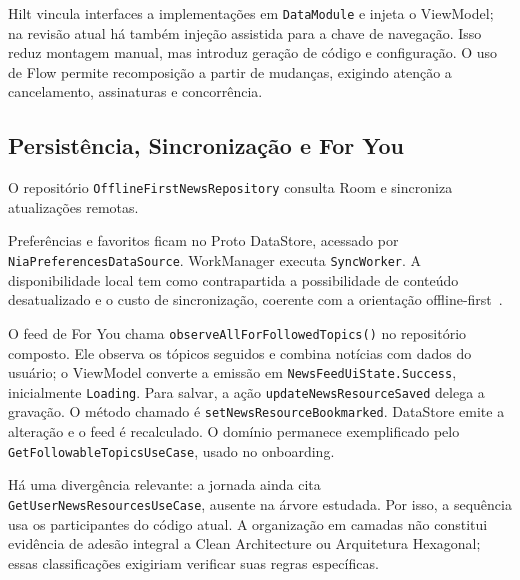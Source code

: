 Hilt vincula interfaces a implementações em \texttt{Data\allowbreak Module} e injeta o
ViewModel; na revisão atual há também injeção assistida para a chave de
navegação. Isso reduz montagem manual, mas introduz geração de código e
configuração. O uso de Flow permite recomposição a partir de mudanças,
exigindo atenção a cancelamento, assinaturas e concorrência.

\subsection{Persistência, Sincronização e For You}
O repositório \texttt{Offline\allowbreak First\allowbreak News\allowbreak Repository} consulta Room e
sincroniza atualizações remotas.

Preferências e favoritos ficam no Proto DataStore,
acessado por \texttt{Nia\allowbreak Preferences\allowbreak Data\allowbreak Source}. WorkManager executa \texttt{Sync\allowbreak Worker}. A disponibilidade local tem como contrapartida a
possibilidade de conteúdo desatualizado e o custo de sincronização, coerente
com a orientação offline-first~\cite{android-offline}.

O feed de For You chama
\texttt{observe\allowbreak All\allowbreak For\allowbreak Followed\allowbreak Topics()} no repositório composto. Ele observa os
tópicos seguidos e combina notícias com dados do usuário; o ViewModel converte
a emissão em \texttt{News\allowbreak Feed\allowbreak Ui\allowbreak State.Success}, inicialmente \texttt{Loading}.
Para salvar, a ação \texttt{update\allowbreak News\allowbreak Resource\allowbreak Saved} delega a gravação.
O método chamado é \texttt{set\allowbreak News\allowbreak Resource\allowbreak Bookmarked}. DataStore emite a alteração e o feed é
recalculado. O domínio permanece exemplificado pelo
\texttt{Get\allowbreak Followable\allowbreak Topics\allowbreak Use\allowbreak Case}, usado no onboarding.

Há uma divergência relevante: a jornada ainda cita
\texttt{Get\allowbreak User\allowbreak News\allowbreak Resources\allowbreak Use\allowbreak Case}, ausente na árvore estudada. Por isso,
a sequência usa os participantes do código atual. A organização em camadas
não constitui evidência de adesão integral a Clean Architecture ou Arquitetura
Hexagonal; essas classificações exigiriam verificar suas regras específicas.
